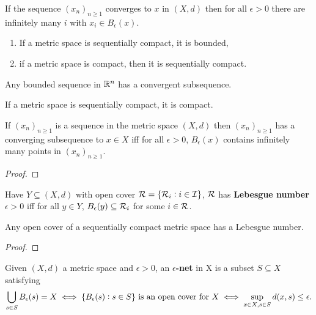 \documentclass[../Year2.tex]{subfiles}
\begin{document}
\begin{proposition}
    If the sequence $(x_n)_{n\geq1}$ converges to $x$ in $(X,d)$ then for all $\epsilon>0$ there are infinitely many $i$ with $x_i\in B_\epsilon(x)$.
\end{proposition}

\begin{proposition}
\begin{enumerate}
    \item If a metric space is sequentially compact, it is bounded,
    \item if a metric space is compact, then it is sequentially compact.
\end{enumerate}
\end{proposition}

\begin{corollary}
    Any bounded sequence in $\mathbb{R}^n$ has a convergent subsequence.
\end{corollary}

\begin{theorem}\label{comp}
    If a metric space is sequentially compact, it is compact.
\end{theorem}

\begin{lemma}
    If $(x_n)_{n\geq1}$ is a sequence in the metric space $(X,d)$ then $(x_n)_{n\geq1}$ has a converging subsequence to $x\in X$ iff for all $\epsilon>0$, $B_\epsilon(x)$ contains infinitely many points in $(x_n)_{n\geq1}$.\begin{proof}
        
    \end{proof}
\end{lemma}

\begin{definition}
    Have $Y\subseteq(X,d)$ with open cover $\mathcal{R}=\{\mathcal{R}_i:i\in\mathcal{I}\}$, $\mathcal{R}$ has \textbf{Lebesgue number} $\epsilon>0$ iff for all $y\in Y$, $B_\epsilon(y)\subseteq\mathcal{R}_i$ for some $i\in\mathcal{R}$.
\end{definition}

\begin{lemma}
    Any open cover of a sequentially compact metric space has a Lebesgue number.\begin{proof}
        
    \end{proof}
\end{lemma}

\begin{definition}
    Given $(X,d)$ a metric space and $\epsilon>0$, an \textbf{$\epsilon$-net} in X is a subset $S\subseteq X$ satisfying \[
        \bigcup_{s\in S}B_\epsilon(s)=X \iff \{B_\epsilon(s): s\in S\} \ \text{\textcolor{black}{is an open cover for }} X \iff \sup_{x\in X, s\in S}d(x,s) \leq \epsilon \text{\textcolor{black}{.}}
    \]
\end{definition}
\end{document}
